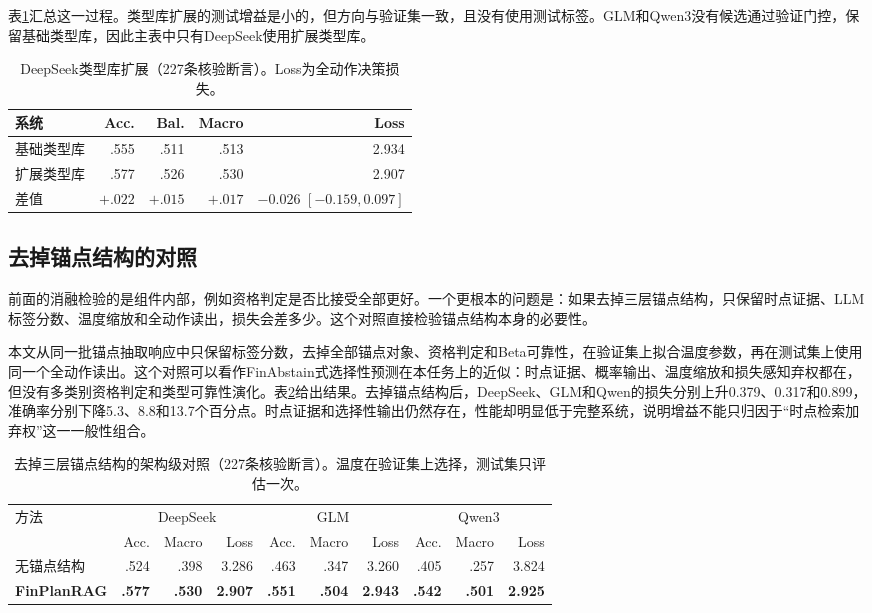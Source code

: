 表\ref{tab:typeevolve}汇总这一过程。类型库扩展的测试增益是小的，但方向与验证集一致，且没有使用测试标签。GLM和Qwen3没有候选通过验证门控，保留基础类型库，因此主表中只有DeepSeek使用扩展类型库。

\begin{table}[htbp]
\centering
{}
\setlength{\tabcolsep}{4pt}
\caption{DeepSeek类型库扩展（227条核验断言）。Loss为全动作决策损失。}
\label{tab:typeevolve}
\begin{tabular}{lrrrr}
\toprule
系统 & Acc. & Bal. & Macro & Loss \\
\midrule
基础类型库 & .555 & .511 & .513 & 2.934 \\
扩展类型库 & .577 & .526 & .530 & 2.907 \\
差值 & $+.022$ & $+.015$ & $+.017$ & $-0.026$ $[-0.159,0.097]$ \\
\bottomrule
\end{tabular}
\end{table}

\subsection{去掉锚点结构的对照}
\label{sec:no-anchor}

前面的消融检验的是组件内部，例如资格判定是否比接受全部更好。一个更根本的问题是：如果去掉三层锚点结构，只保留时点证据、LLM标签分数、温度缩放和全动作读出，损失会差多少。这个对照直接检验锚点结构本身的必要性。

本文从同一批锚点抽取响应中只保留标签分数，去掉全部锚点对象、资格判定和Beta可靠性，在验证集上拟合温度参数，再在测试集上使用同一个全动作读出。这个对照可以看作FinAbstain式选择性预测在本任务上的近似：时点证据、概率输出、温度缩放和损失感知弃权都在，但没有多类别资格判定和类型可靠性演化。表\ref{tab:noanchor}给出结果。去掉锚点结构后，DeepSeek、GLM和Qwen的损失分别上升0.379、0.317和0.899，准确率分别下降5.3、8.8和13.7个百分点。时点证据和选择性输出仍然存在，性能却明显低于完整系统，说明增益不能只归因于“时点检索加弃权”这一一般性组合。

\begin{table}[htbp]
\centering
{}
\setlength{\tabcolsep}{4pt}
\caption{去掉三层锚点结构的架构级对照（227条核验断言）。温度在验证集上选择，测试集只评估一次。}
\label{tab:noanchor}
\begin{tabular}{lrrrrrrrrr}
\toprule
\multirow{2}{*}{方法} & \multicolumn{3}{c}{DeepSeek} & \multicolumn{3}{c}{GLM} & \multicolumn{3}{c}{Qwen3} \\
\cmidrule(lr){2-4}\cmidrule(lr){5-7}\cmidrule(lr){8-10}
 & Acc. & Macro & Loss & Acc. & Macro & Loss & Acc. & Macro & Loss \\
\midrule
无锚点结构 & .524 & .398 & 3.286 & .463 & .347 & 3.260 & .405 & .257 & 3.824 \\
\textbf{FinPlanRAG} & \textbf{.577} & \textbf{.530} & \textbf{2.907} & \textbf{.551} & \textbf{.504} & \textbf{2.943} & \textbf{.542} & \textbf{.501} & \textbf{2.925} \\
\bottomrule
\end{tabular}
\end{table}


